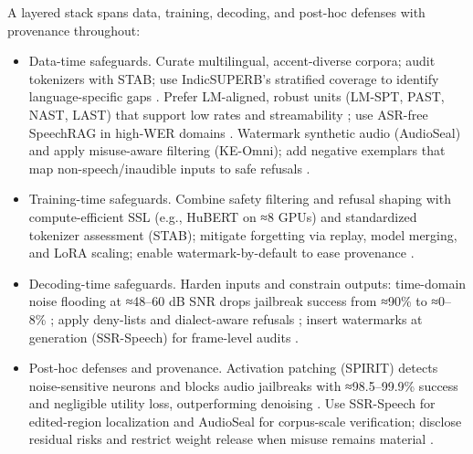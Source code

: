 A layered stack spans data, training, decoding, and post-hoc defenses with provenance throughout:
\begin{itemize}
\item Data-time safeguards. Curate multilingual, accent-diverse corpora; audit tokenizers with STAB; use IndicSUPERB’s stratified coverage to identify language-specific gaps \cite{vashishth2024stabspeechtokenizerassessmentbenchmark,entry2025indicsuperbspeechprocessinguniversalperf}. Prefer LM-aligned, robust units (LM-SPT, PAST, NAST, LAST) that support low rates and streamability \cite{jo2025lmsptalignedsemanticdistillationspeechto,har-tuv2025pastphoneticacousticspeechtokenizer,messica2024nastnoiseawarespeechtokenizationlanguage,turetzky2024lastlanguagemodelawarespeechtokenization}; use ASR-free SpeechRAG in high-WER domains \cite{min2025speechretrievalaugmentedgenerationwithou}. Watermark synthetic audio (AudioSeal) and apply misuse-aware filtering (KE-Omni); add negative exemplars that map non-speech/inaudible inputs to safe refusals \cite{zhao2024advancingspeechlanguagemodelsscalingsupe,dao2025ichigomixedmodalearlyfusionrealtimevoice}.
\item Training-time safeguards. Combine safety filtering and refusal shaping with compute-efficient SSL (e.g., HuBERT on ≈8 GPUs) and standardized tokenizer assessment (STAB); mitigate forgetting via replay, model merging, and LoRA scaling; enable watermark-by-default to ease provenance \cite{chen2023reducingbarriersselfsupervisedlearninghu,vashishth2024stabspeechtokenizerassessmentbenchmark,hsiao2025analyzingmitigationstrategiescatastrophi,wang2025ssrspeechtowardsstablesaferobustzeroshot,zhu2024generativepretrainedspeechlanguagemodele}.
\item Decoding-time safeguards. Harden inputs and constrain outputs: time-domain noise flooding at ≈48–60 dB SNR drops jailbreak success from ≈90\% to ≈0–8\% \cite{peri2024speechguardexploringadversarialrobustnes}; apply deny-lists and dialect-aware refusals \cite{dao2025ichigomixedmodalearlyfusionrealtimevoice}; insert watermarks at generation (SSR-Speech) for frame-level audits \cite{wang2025ssrspeechtowardsstablesaferobustzeroshot}.
\item Post-hoc defenses and provenance. Activation patching (SPIRIT) detects noise-sensitive neurons and blocks audio jailbreaks with ≈98.5–99.9\% success and negligible utility loss, outperforming denoising \cite{djanibekov2025spiritpatchingspeechlanguagemodelsagains}. Use SSR-Speech for edited-region localization and AudioSeal for corpus-scale verification; disclose residual risks and restrict weight release when misuse remains material \cite{wang2025ssrspeechtowardsstablesaferobustzeroshot,zhao2024advancingspeechlanguagemodelsscalingsupe,park2025longformspeechgenerationspokenlanguagemo}.
\end{itemize}

